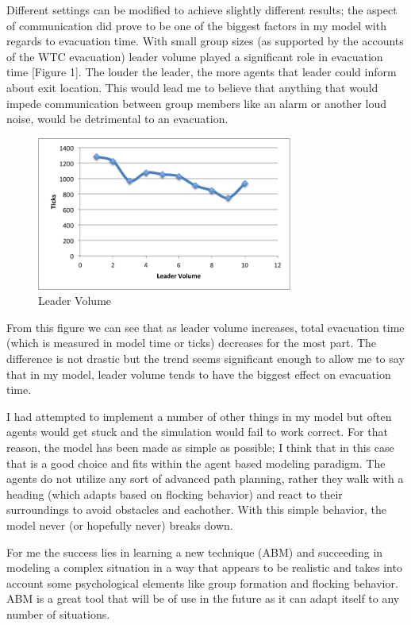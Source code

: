 \documentclass{article}
\begin{document}
Different settings can be modified to achieve slightly different results; the aspect of communication did prove to be one of the biggest factors in my model with regards to evacuation time. With small group sizes (as supported by the accounts of the WTC evacuation) leader volume played a significant role in evacuation time [Figure 1]. The louder the leader, the more agents that leader could inform about exit location. This would lead me to believe that anything that would impede communication between group members like an alarm or another loud noise, would be detrimental to an evacuation.

\begin{figure}[h!]
  \caption{Leader Volume}
  \centering
    \includegraphics[width=0.75\textwidth]{leadervolume}
\end{figure}

From this figure we can see that as leader volume increases, total evacuation time (which is measured in model time or ticks) decreases for the most part. The difference is not drastic but the trend seems significant enough to allow me to say that in my model, leader volume tends to have the biggest effect on evacuation time. 

I had attempted to implement a number of other things in my model but often agents would get stuck and the simulation would fail to work correct. For that reason, the model has been made as simple as possible; I think that in this case that is a good choice and fits within the agent based modeling paradigm. The agents do not utilize any sort of advanced path planning, rather they walk with a heading (which adapts based on flocking behavior) and react to their surroundings to avoid obstacles and eachother. With this simple behavior, the model never (or hopefully never) breaks down.

For me the success lies in learning a new technique (ABM) and succeeding in modeling a complex situation in a way that appears to be realistic and takes into account some psychological elements like group formation and flocking behavior. ABM is a great tool that will be of use in the future as it can adapt itself to any number of situations.
\end{document}
